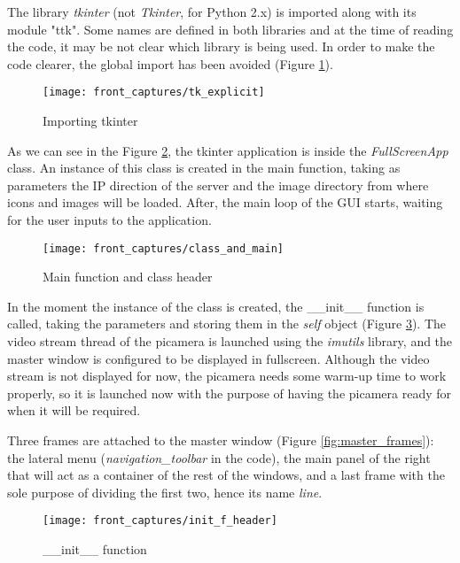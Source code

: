 The library \textit{tkinter} (not \textit{Tkinter}, for Python 2.x) is imported along with its module "ttk". Some names are defined in both libraries and at the time of reading the code, it may be not clear which library is being used. In order to make the code clearer, the global import has been avoided (Figure \ref{fig:import_tkinter}). 

\begin{figure}[!ht]
	\centering
	\texttt{[image: front\_captures/tk\_explicit]}
	\caption{Importing tkinter}
	\label{fig:import_tkinter}
\end{figure}

As we can see in the Figure \ref{fig:class_and_main}, the tkinter application is inside the \textit{FullScreenApp} class. An instance of this class is created in the main function, taking as parameters the IP direction of the server and the image directory from where icons and images will be loaded. After, the main loop of the GUI starts, waiting for the user inputs to the application. 

\begin{figure}[!ht]
	\centering
	\texttt{[image: front\_captures/class\_and\_main]}
	\caption{Main function and class header}
	\label{fig:class_and_main}
\end{figure}

In the moment the instance of the class is created, the {\_\_}init{\_\_} function is called, taking the parameters and storing them in the \textit{self} object (Figure \ref{fig:init_head}). The video stream thread of the \gls{picamera} is launched using the \textit{imutils} library, and the master window is configured to be displayed in fullscreen. Although the video stream is not displayed for now, the picamera needs some warm-up time to work properly, so it is launched now with the purpose of having the picamera ready for when it will be required. 

Three frames are attached to the master window (Figure \ref{fig:master_frames}): the lateral menu (\textit{navigation{\_}toolbar} in the code), the main panel of the right that will act as a container of the rest of the windows, and a last frame with the sole purpose of dividing the first two, hence its name \textit{line}.

\clearpage

\begin{figure}[!ht]
	\centering
	\texttt{[image: front\_captures/init\_f\_header]}
	\caption{{\_\_}init{\_\_} function}
	\label{fig:init_head}
\end{figure}

